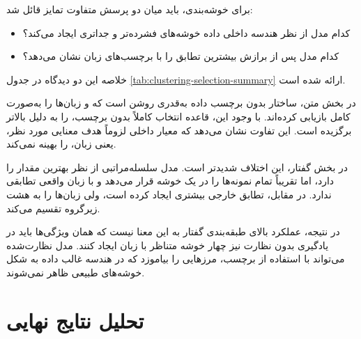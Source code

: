 برای خوشه‌بندی، باید میان دو پرسش متفاوت تمایز قائل شد:

\begin{itemize}
	\item کدام مدل از نظر هندسه داخلی داده خوشه‌های فشرده‌تر و جدا‌تری ایجاد می‌کند؟
	\item کدام مدل پس از برازش بیشترین تطابق را با برچسب‌های زبان نشان می‌دهد؟
\end{itemize}

خلاصه این دو دیدگاه در جدول
\ref{tab:clustering-selection-summary}
ارائه شده است.

\begin{table}[H]
\centering
\caption{تفاوت انتخاب داخلی و تطابق خارجی در خوشه‌بندی}
\label{tab:clustering-selection-summary}
\small
{}
\end{table}

در بخش متن، ساختار بدون برچسب داده به‌قدری روشن است که
و
زبان‌ها را به‌صورت کامل بازیابی کرده‌اند. با وجود این، قاعده انتخاب کاملاً بدون برچسب،
را به دلیل
بالاتر برگزیده است. این تفاوت نشان می‌دهد که معیار داخلی لزوماً هدف معنایی مورد نظر، یعنی زبان، را بهینه نمی‌کند.

در بخش گفتار، این اختلاف شدیدتر است. مدل سلسله‌مراتبی از نظر
بهترین مقدار را دارد، اما تقریباً تمام نمونه‌ها را در یک خوشه قرار می‌دهد و با زبان واقعی تطابقی ندارد. در مقابل،
تطابق خارجی بیشتری ایجاد کرده است، ولی زبان‌ها را به هشت زیرگروه تقسیم می‌کند.

در نتیجه، عملکرد بالای طبقه‌بندی گفتار به این معنا نیست که همان ویژگی‌ها باید در یادگیری بدون نظارت نیز چهار خوشه متناظر با زبان ایجاد کنند. مدل نظارت‌شده می‌تواند با استفاده از برچسب، مرزهایی را بیاموزد که در هندسه غالب داده به شکل خوشه‌های طبیعی ظاهر نمی‌شوند.


\section{تحلیل نتایج نهایی}


